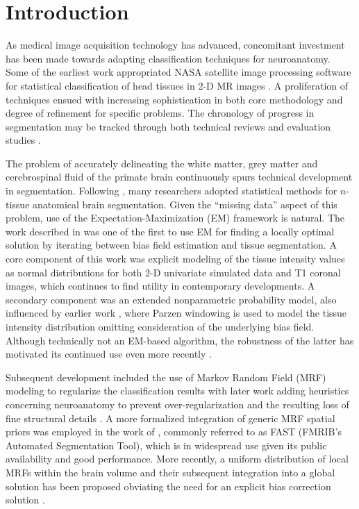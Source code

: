 \documentclass[11pt,english]{article}
\begin{document}
\clearpage

\section{Introduction} As medical image acquisition technology has advanced,
concomitant investment has been made towards adapting classification
techniques for neuroanatomy.  Some of the earliest work appropriated NASA
satellite image processing software for statistical classification of
head tissues in 2-D MR images \citep{Vannier1985}.  A proliferation of
techniques ensued with increasing sophistication in both core
methodology and degree of refinement for specific problems.  The
chronology of progress in segmentation may be tracked through both
technical reviews
\citep{Bezdek1993,Pal1993,Clarke1995,Pham2000,Viergever2001,Suri2002,Duncan2004,Balafar2010}
and evaluation studies
\citep[e.g.][]{Cuadra2005,Zaidi2006,Klauschen2009,Boer2010}.

The problem of accurately delineating the white matter, grey matter
and cerebrospinal fluid of the primate brain continuously spurs
technical development in segmentation.  Following \cite{Vannier1985},
many researchers adopted statistical methods for $n$-tissue anatomical
brain segmentation.  Given the ``missing data'' aspect of this
problem, use of the Expectation-Maximization (EM) framework is natural\citep{Dempster1977}.  The
work described in \cite{Wells1996} was one of the first to use EM for
finding a locally optimal solution by iterating between bias field
estimation and tissue segmentation.  A core component of this work was
explicit modeling of the tissue intensity values as normal
distributions \citep{Cline1990} for both 2-D univariate simulated data
and T1 coronal images, which continues to find utility in contemporary
developments.  A secondary component was an extended nonparametric
probability model, also influenced by earlier work \citep{Kikinis1992}, where
Parzen windowing is used to model the tissue intensity distribution
omitting consideration of the underlying bias field.  Although
technically not an EM-based algorithm, the robustness of the latter has motivated its continued use even more recently \citep[e.g.][]{Weisenfeld2009}.

Subsequent development included the use of Markov Random Field (MRF)  modeling \citep{Geman1984}
to regularize the classification results \citep{Held1997} with later work adding heuristics concerning neuroanatomy to prevent 
over-regularization and the resulting loss of fine structural details \citep{Leemput1999,Leemput1999a}.  
A more formalized integration of generic MRF spatial priors was employed in the work of \cite{Zhang2001}, 
commonly referred to as FAST (FMRIB's Automated Segmentation Tool), which is in widespread use
given its public availability and good performance.  More recently, a uniform distribution of local MRFs within the brain volume and their subsequent integration into a global solution has been proposed obviating the need for an 
explicit bias correction solution \citep{Scherrer2009}.  
\end{document}
